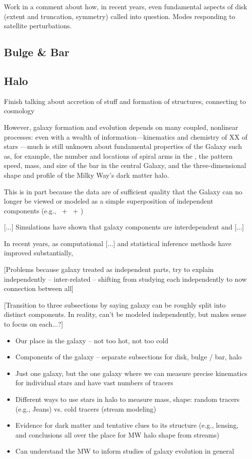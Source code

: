 Work in a comment about how, in recent years, even fundamental aspects of disk (extent and truncation, symmetry) called into question. Modes responding to satellite perturbations.

\subsection{Bulge \& Bar}

\subsection{Halo}

Finish talking about accretion of stuff and formation of structures, connecting to cosmology


However, galaxy formation and evolution depends on many coupled, nonlinear processes: even with a wealth of information---kinematics and chemistry of XX of stars \citep{todo}---much is still unknown about fundamental properties of the Galaxy such as, for example, the number and locations of spiral arms in the \mwdisk, the pattern speed, mass, and size of the bar in the central Galaxy, and the three-dimensional shape and profile of the Milky Way's dark matter halo. 

This is in part because the data are of sufficient quality that the Galaxy can no longer be viewed or modeled as a simple superposition of independent components (e.g., \mwdisk\ + \mwbulge\ + \mwhalo)

[...] Simulations have shown that galaxy components are interdependent and [...] \citep{todo}

In recent years, as computational [...] and statistical inference methods have improved substantially, 

[Problems because galaxy treated as independent parts, try to explain independently -- inter-related -- shifting from studying each independently to now connection between all]

[Transition to three subsections by saying galaxy can be roughly split into distinct components. In reality, can't be modeled independently, but makes sense to focus on each...?]





\begin{itemize}
	\item Our place in the galaxy -- not too hot, not too cold
	\item Components of the galaxy -- separate subsections for disk, bulge / bar, halo
	\item Just one galaxy, but the one galaxy where we can measure precise kinematics for individual stars and have vast numbers of tracers
	\item Different ways to use stars in halo to measure mass, shape: random tracers (e.g., Jeans) vs. cold tracers (stream modeling)
	\item Evidence for dark matter and tentative clues to its structure (e.g., lensing, and conclusions all over the place for MW halo shape from streams)
	\item Can understand the MW to inform studies of galaxy evolution in general
\end{itemize}

